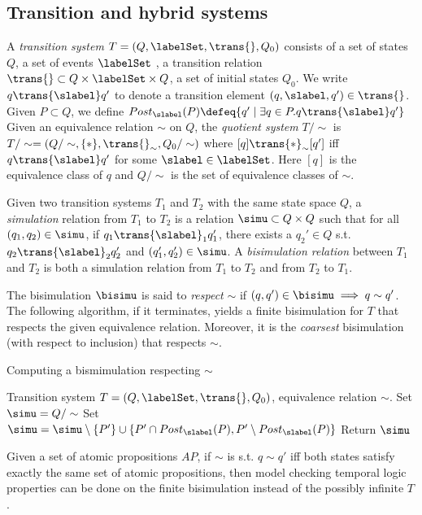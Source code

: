 \subsection{Transition and hybrid systems}
\label{sec:transition systems}

\begin{defn}
	\label{defn:transition system}
	A \emph{transition system} $T = (Q,\labelSet,\trans{},Q_0)$ consists of a set of states $Q$, a set of events $\labelSet$ , a transition relation $\trans{} \subset Q \times \labelSet \times Q$, a set of initial states $Q_0$. 
	We write $q \trans{\slabel}q'$ to denote a transition element $(q,\slabel,q') \in \trans{}$.
	Given $P\subset Q$, we define $Post_\slabel(P) \defeq \{q'\;|\;\exists q\in P. q \trans{\slabel}q'\}$
	Given an equivalence relation $\sim$ on $Q$, the \emph{quotient system} $T/\sim$ is
	$T/\sim = (Q/\sim, \{*\}, \trans{}_\sim, Q_0/\sim)$
	where $[q] \trans{*}_\sim [q']$ iff $q \trans{\slabel} q'$ for some $\slabel \in \labelSet$.
	Here $[q]$ is the equivalence class of $q$ and $Q/\sim$ is the set of equivalence classes of $\sim$.
\end{defn}

\begin{defn}
	\label{defn:simulation}	
	Given two transition systems $T_1$ and $T_2$ with the same state space $Q$,
	a \emph{simulation} relation from $T_1$ to $T_2$ is a relation $\simu \subset Q \times Q$ such that 
	for all $(q_1,q_2) \in \simu$, if $q_1 \trans{\slabel}_1 q_1'$, there exists a $q_2' \in Q$ s.t. $q_2 \trans{\slabel}_2 q_2'$ and $(q_1',q_2') \in \simu$.
	A \emph{bisimulation relation} between $T_1$ and $T_2$ is both a simulation relation from $T_1$ to $T_2$ and from $T_2$ to $T_1$.
\end{defn}
The bisimulation $\bisimu$ is said to \emph{respect} $\sim$ if $(q,q') \in \bisimu \implies q \sim q'$.
%
The following algorithm, if it terminates, yields a finite bisimulation for $T$ that respects the given equivalence relation.
Moreover, it is the \emph{coarsest} bisimulation (with respect to inclusion) that respects $\sim$.
\begin{algorithm}[t]
		\caption{Computing a bismimulation respecting $\sim$}
		\label{algo:bisimulation}
		\begin{algorithmic}
			\Require Transition system $T = (Q,\labelSet,\trans{},Q_0)$, equivalence relation $\sim$.
			\State Set $\simu = Q/\sim$			
				\State Set $\simu = \simu \setminus \{P'\} \cup \{P' \cap Post_\slabel(P) , P' \setminus Post_\slabel(P) \}$
			\EndWhile	
			\State Return $\simu$
		\end{algorithmic}
\end{algorithm}
Given a set of atomic propositions $AP$, if $\sim$ is s.t. $q \sim q'$ iff both states satisfy exactly the same set of atomic propositions, then model checking temporal logic properties can be done on the finite bisimulation instead of the possibly infinite $T$.
